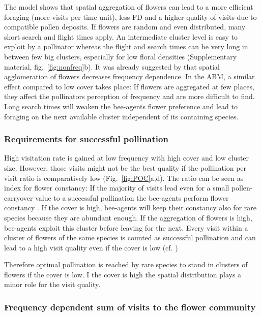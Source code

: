 The model shows that spatial aggregation of flowers can lead to a more efficient foraging (more visits per time unit), less FD and a higher quality of visits due to compatible pollen deposits. If flowers are random and even distributed, many short search and flight times apply. An intermediate cluster level is easy to exploit by a pollinator whereas the flight and search times can be very long in between few big clusters, especially for low floral densities (Supplementary material, fig.~\ref{fig:nonfreq}b). 
It was already suggested by \cite{epperson1987frequency} that spatial agglomeration of flowers decreases frequency dependence. In the ABM, a similar effect compared to low cover takes place: If flowers are aggregated at few places, they affect the pollinators perception of frequency and are more difficult to find. Long search times will weaken the bee-agents flower preference and lead to foraging on the next available cluster independent of its containing species.


\subsubsection*{Requirements for successful pollination}
High visitation rate is gained at low frequency with high cover and low cluster size. However, those visits might not be the best quality if the pollination per visit ratio is comparatively low (Fig.~\ref{fig:POC}a,d). 
The ratio can be seen as index for flower constancy: If the majority of visits lead even for a small pollen-carryover value to a successful pollination the bee-agents perform flower constancy \citep{montgomery2009pollen}. If the cover is high, bee-agents will keep their constancy also for rare species because they are abundant enough. If the aggregation of flowers is high, bee-agents exploit this cluster before leaving for the next. Every visit within a cluster of flowers of the same species is counted as successful pollination and can lead to a high visit quality even if the cover is low (cf. \citealt{jakobsson2009relationships})

Therefore optimal pollination is reached by rare species to stand in clusters of flowers if the cover is low. I the cover is high the spatial distribution plays a minor role for the visit quality.  


\subsubsection*{Frequency dependent sum of visits to the flower community}


